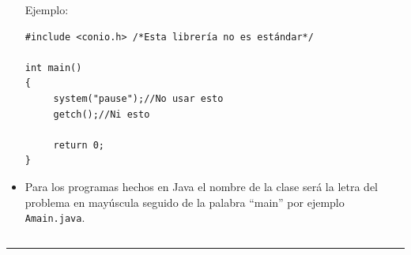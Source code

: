 \begin{titlepage}
\begin{itemize}
    Ejemplo:
    
    \begin{verbatim}
#include <conio.h> /*Esta librería no es estándar*/

int main()
{
     system("pause");//No usar esto
     getch();//Ni esto
    
     return 0;
}
    \end{verbatim}
    
    \item Para los programas hechos en Java el nombre de la clase será la letra del problema en mayúscula seguido de la palabra ``main'' por ejemplo \texttt{Amain.java}.

    
\end{itemize}

$$$$
$$$$

\noindent \rule[0.5ex]{1\columnwidth}{1pt}



\end{titlepage}